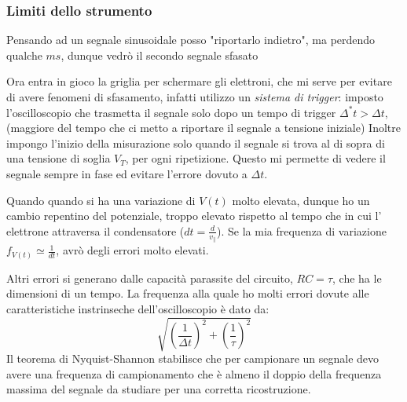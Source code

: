 \documentclass{article}
\begin{document}
\subsubsection{Limiti dello strumento}
Pensando ad un segnale sinusoidale posso "riportarlo indietro", ma perdendo qualche $ms$, dunque vedrò il secondo segnale sfasato

\begin{center}
\end{center}
Ora entra in gioco la griglia per schermare gli elettroni, 
che mi serve per evitare di avere fenomeni di sfasamento,
infatti utilizzo un \textit{sistema di trigger}: imposto l'oscilloscopio che trasmetta il segnale solo dopo un tempo di trigger $\Delta^* t > \Delta t$,
(maggiore del tempo che ci metto a riportare il segnale a tensione iniziale)
Inoltre impongo l'inizio della misurazione solo quando il segnale si trova al di sopra di una tensione di soglia $V_T$, per ogni ripetizione.
Questo mi permette di vedere il segnale sempre in fase ed evitare l'errore dovuto a $\Delta t$. 

Quando quando si ha una variazione di $V(t)$ molto elevata, dunque ho un cambio repentino
del potenziale, troppo elevato rispetto al tempo che in cui l' elettrone attraversa il condensatore ($dt= \frac{d}{v_{\parallel}}$). Se la mia frequenza di variazione $f_{V(t)} \simeq \frac{1}{dt}$, avrò degli errori molto elevati. 

Altri errori si generano dalle capacità parassite del circuito, $RC = \tau$, che ha le dimensioni di un tempo. La frequenza alla quale ho molti errori dovute alle caratteristiche instrinseche dell'oscilloscopio è dato da:
\[
\sqrt{{(\frac{1}{\Delta t })}^2+ {(\frac{1}{\tau})}^2}
\]
Il teorema di Nyquist-Shannon stabilisce che per campionare un segnale devo avere una frequenza di campionamento che è almeno il doppio della frequenza massima del segnale da studiare per una corretta ricostruzione.
\end{document}
